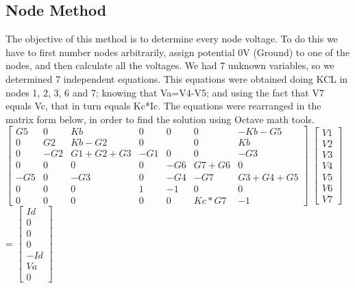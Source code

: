 \documentclass[11en, a4paper, oneside]{article}
\begin{document}
\subsection{Node Method}
The objective of this method is to determine every node voltage. To do this we have to first number nodes arbitrarily, assign potential 0V (Ground) to one of the nodes, and then calculate all the voltages. We had 7 unknown variables, so we determined 7 independent equations. This equations were obtained doing KCL in nodes 1, 2, 3, 6 and 7; knowing that Va=V4-V5; and using the fact that V7 equals Vc, that in turn equals Kc*Ic. The equations were rearranged in the matrix form below, in order to find the solution using Octave math tools.\\


$\begin{bmatrix}
G5 & 0 & Kb & 0 & 0 & 0 & -Kb-G5\\
0 & G2 & Kb-G2 & 0 &  & 0 & Kb\\
0 & -G2 & G1+G2+G3 & -G1 & 0 & 0 & -G3\\
0 & 0 & 0 & 0 & -G6 & G7+G6 & 0\\
-G5 & 0 & -G3 & 0 & -G4 & -G7 & G3+G4+G5\\
0 & 0 & 0 & 1 & -1 & 0 & 0\\
0 & 0 & 0 & 0 & 0 & Kc*G7 & -1
\end{bmatrix}$
$\begin{bmatrix}
V1 \\ V2 \\ V3 \\ V4 \\ V5 \\ V6 \\ V7
\end{bmatrix}$
= 
$\begin{bmatrix}
Id \\ 0 \\ 0 \\ 0 \\ -Id \\ Va \\ 0
\end{bmatrix}$
 
\end{document}
